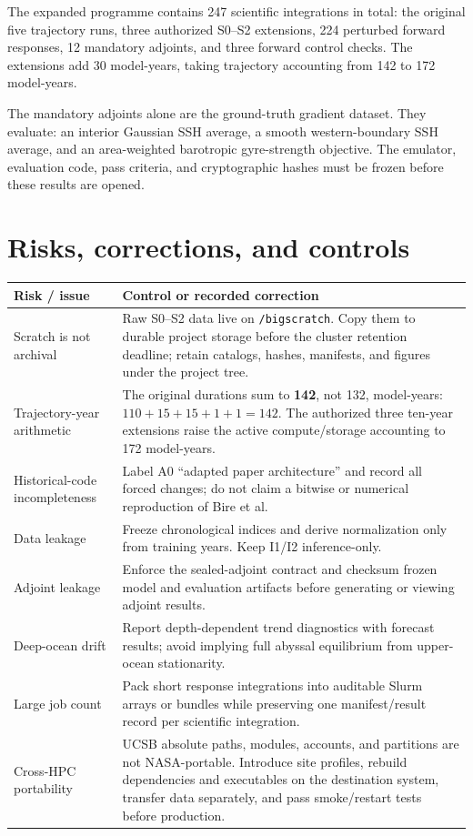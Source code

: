 \documentclass[11pt]{article}
\begin{document}
The expanded programme contains 247 scientific integrations in total: the original
five trajectory runs, three authorized S0--S2 extensions, 224 perturbed forward
responses, 12 mandatory adjoints, and three forward control checks.  The extensions add
30 model-years, taking trajectory accounting from 142 to 172 model-years.

The mandatory adjoints alone are the ground-truth gradient dataset.  They evaluate:
an interior Gaussian SSH average, a smooth western-boundary SSH average, and an
area-weighted barotropic gyre-strength objective.  The emulator, evaluation code, pass
criteria, and cryptographic hashes must be frozen before these results are opened.

\section{Risks, corrections, and controls}

\begin{tabularx}{\textwidth}{@{}p{}Y@{}}
\toprule
\textbf{Risk / issue} & \textbf{Control or recorded correction} \\
\midrule
Scratch is not archival & Raw S0--S2 data live on \texttt{/bigscratch}.  Copy them to
durable project storage before the cluster retention deadline; retain catalogs, hashes,
manifests, and figures under the project tree. \\
Trajectory-year arithmetic & The original durations sum to \textbf{142}, not 132,
model-years: $110+15+15+1+1=142$.  The authorized three ten-year extensions raise the
active compute/storage accounting to 172 model-years. \\
Historical-code incompleteness & Label A0 ``adapted paper architecture'' and record all
forced changes; do not claim a bitwise or numerical reproduction of Bire et al. \\
Data leakage & Freeze chronological indices and derive normalization only from training
years.  Keep I1/I2 inference-only. \\
Adjoint leakage & Enforce the sealed-adjoint contract and checksum frozen model and
evaluation artifacts before generating or viewing adjoint results. \\
Deep-ocean drift & Report depth-dependent trend diagnostics with forecast results;
avoid implying full abyssal equilibrium from upper-ocean stationarity. \\
Large job count & Pack short response integrations into auditable Slurm arrays or
bundles while preserving one manifest/result record per scientific integration. \\
Cross-HPC portability & UCSB absolute paths, modules, accounts, and partitions are not
NASA-portable.  Introduce site profiles, rebuild dependencies and executables on the
destination system, transfer data separately, and pass smoke/restart tests before
production. \\
\bottomrule
\end{tabularx}
\end{document}
